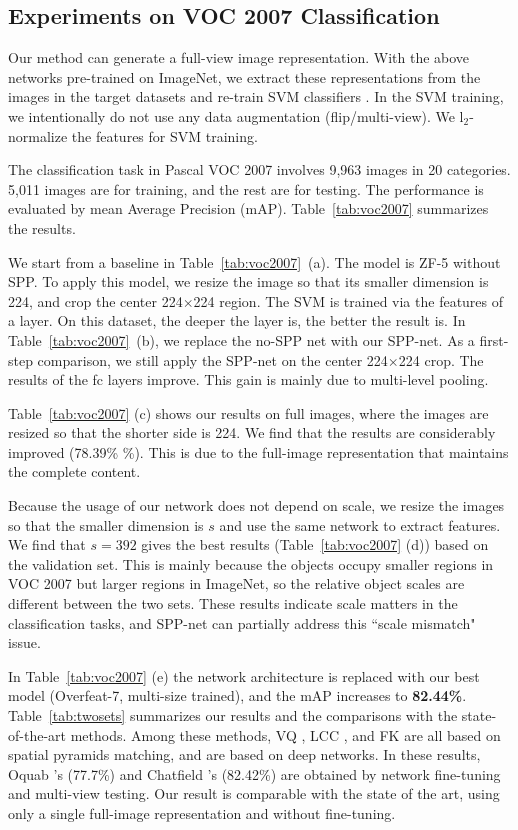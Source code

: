 \documentclass[10pt,journal,cspaper,compsoc]{IEEEtran}
\begin{document}
\subsection{Experiments on VOC 2007 Classification}

Our method can generate a full-view image representation.
With the above networks pre-trained on ImageNet, we extract these representations from the images in the target datasets and re-train SVM classifiers \cite{Chang2011}. In the SVM training, we intentionally do not use any data augmentation (flip/multi-view). We l$_2$-normalize the features for SVM training.

The classification task in Pascal VOC 2007 \cite{Everingham2007} involves 9,963 images in 20 categories. 5,011 images are for training, and the rest are for testing. The performance is evaluated by mean Average Precision (mAP). Table~\ref{tab:voc2007} summarizes the results.

We start from a baseline in Table~\ref{tab:voc2007}~(a). The model is ZF-5 without SPP. To apply this model, we resize the image so that its smaller dimension is 224, and crop the center 224$\times$224 region.
The SVM is trained via the features of a layer. On this dataset, the deeper the layer is, the better the result is. In Table~\ref{tab:voc2007}~(b), we replace the no-SPP net with our SPP-net. As a first-step comparison, we still apply the SPP-net on the center 224$\times$224 crop. The results of the fc layers improve. This gain is mainly due to multi-level pooling.

Table~\ref{tab:voc2007} (c) shows our results on full images, where the images are resized so that the shorter side is 224. We find that the results are considerably improved (78.39\% \%). This is due to the full-image representation that maintains the complete content.

Because the usage of our network does not depend on scale, we resize the images so that the smaller dimension is $s$ and use the same network to extract features. We find that $s=392$ gives the best results (Table~\ref{tab:voc2007} (d)) based on the validation set.
This is mainly because the objects occupy smaller regions in VOC 2007 but larger regions in ImageNet, so the relative object scales are different between the two sets. These results indicate scale matters in the classification tasks, and SPP-net can partially address this ``scale mismatch" issue.

In Table~\ref{tab:voc2007} (e) the network architecture is replaced with our best model (Overfeat-7, multi-size trained), and the mAP increases to \textbf{82.44\%}.
Table~\ref{tab:twosets} summarizes our results and the comparisons with the state-of-the-art methods. Among these methods, VQ \cite{Lazebnik2006}, LCC \cite{Wang2010}, and FK \cite{Perronnin2010} are all based on spatial pyramids matching, and \cite{Donahue2013,Zeiler2013,Oquab2014,Chatfield2014} are based on deep networks. In these results, Oquab \etal's (77.7\%) and Chatfield \etal's (82.42\%) are obtained by network fine-tuning and multi-view testing. Our result is comparable with the state of the art, using only a single full-image representation and without fine-tuning.
\end{document}
